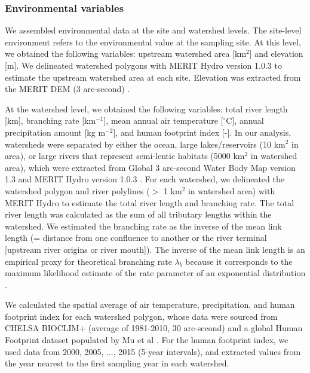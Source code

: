 \documentclass[11pt, class=article, crop=false]{standalone}
\theoremstyle{definition}
\begin{document}
\subsubsection{Environmental variables}

We assembled environmental data at the site and watershed levels.
The site-level environment refers to the environmental value at the sampling site.
At this level, we obtained the following variables: upstream watershed area [km$^2$] and elevation [m].
We delineated watershed polygons with MERIT Hydro version 1.0.3 \citep{yamazaki_merit_2019} to estimate the upstream watershed area at each site.
Elevation was extracted from the MERIT DEM (3 arc-second) \citep{yamazaki_high-accuracy_2017}.

At the watershed level, we obtained the following variables: total river length [km], branching rate [km$^{-1}$], mean annual air temperature [$^\circ$C], annual precipitation amount [kg m$^{-2}$], and human footprint index [-].
In our analysis, watersheds were separated by either the ocean, large lakes/reservoirs (10 km$^{2}$ in area), or large rivers that represent semi-lentic habitats (5000 km$^{2}$ in watershed area), which were extracted from Global 3 arc-second Water Body Map version 1.3 \citep{yamazaki_development_2015} and MERIT Hydro version 1.0.3 \citep{yamazaki_merit_2019}.
For each watershed, we delineated the watershed polygon and river polylines ($>$ 1 km$^2$ in watershed area) with MERIT Hydro to estimate the total river length and branching rate.
The total river length was calculated as the sum of all tributary lengths within the watershed.
We estimated the branching rate as the inverse of the mean link length (= distance from one confluence to another or the river terminal [upstream river origins or river mouth]).
The inverse of the mean link length is an empirical proxy for theoretical branching rate $\lambda_b$ because it corresponds to the maximum likelihood estimate of the rate parameter of an exponential distribution \citep{terui_revisiting_2024}.

We calculated the spatial average of air temperature, precipitation, and human footprint index for each watershed polygon, whose data were sourced from CHELSA BIOCLIM+ (average of 1981-2010, 30 arc-second) \citep{brun_global_2022} and a global Human Footprint dataset populated by Mu et al \citep{mu_global_2022}.
For the human footprint index, we used data from 2000, 2005, ..., 2015 (5-year intervals), and extracted values from the year nearest to the first sampling year in each watershed.
\end{document}
